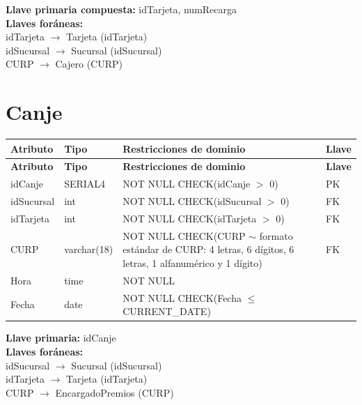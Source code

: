 \documentclass[12pt]{article}
\begin{document}
\vspace{2pt}
\textbf{Llave primaria compuesta:} idTarjeta, numRecarga\\
\textbf{Llaves foráneas:}\\
idTarjeta $\rightarrow$ Tarjeta (idTarjeta)\\
idSucursal $\rightarrow$ Sucursal (idSucursal)\\
CURP $\rightarrow$ Cajero (CURP)\\


\section*{Canje}

\begin{longtable}{p{3.5cm} p{2.5cm} p{7.5cm} p{1.5cm}}
\label{tab:canje}\\
\toprule
\textbf{Atributo} & \textbf{Tipo} & \textbf{Restricciones de dominio} & \textbf{Llave} \\
\midrule
\endfirsthead

\toprule
\textbf{Atributo} & \textbf{Tipo} & \textbf{Restricciones de dominio} & \textbf{Llave} \\
\midrule
\endhead
\bottomrule
\endfoot

idCanje 
& SERIAL4 
& NOT NULL \newline CHECK(idCanje $>$ 0)
& PK \\

idSucursal 
& int 
& NOT NULL \newline CHECK(idSucursal $>$ 0)
& FK \\

idTarjeta 
& int 
& NOT NULL \newline CHECK(idTarjeta $>$ 0)
& FK \\

CURP 
& varchar(18) 
& NOT NULL \newline CHECK(CURP $\sim$ formato estándar de CURP: 4 letras, 6 dígitos, 6 letras, 1 alfanumérico y 1 dígito)
& FK \\

Hora 
& time 
& NOT NULL
&  \\

Fecha 
& date 
& NOT NULL \newline CHECK(Fecha $\leq$ CURRENT\_DATE)
&  \\

\end{longtable}

\vspace{2pt}
\textbf{Llave primaria:} idCanje\\
\textbf{Llaves foráneas:}\\
idSucursal $\rightarrow$ Sucursal (idSucursal)\\
idTarjeta $\rightarrow$ Tarjeta (idTarjeta)\\
CURP $\rightarrow$ EncargadoPremios (CURP)\\
\end{document}
